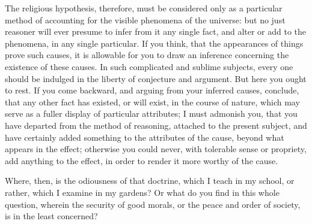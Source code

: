 \documentclass[]{article}
\begin{document}
\begin{sectionbody}
\humeparagraph  The religious hypothesis, therefore, must be considered only as a particular method of accounting for the visible phenomena of the universe: but no just reasoner will ever presume to infer from it any single fact, and alter or add to the phenomena, in any single particular. If you think, that the appearances of things prove such causes, it is allowable for you to draw an inference concerning the existence of these causes. In such complicated and sublime subjects, every one should be indulged in the liberty of conjecture and argument. But here you ought to rest. If you come backward, and arguing from your inferred causes, conclude, that any other fact has existed, or will exist, in the course of nature, which may serve as a fuller display of particular attributes; I must admonish you, that you have departed from the method of reasoning, attached to the present subject, and have certainly added something to the attributes of the cause, beyond what appears in the effect; otherwise you could never, with tolerable sense or propriety, add anything to the effect, in order to render it more worthy of the cause.

\humeparagraph  Where, then, is the odiousness of that doctrine, which I teach in my school, or rather, which I examine in my gardens? Or what do you find in this whole question, wherein the security of good morals, or the peace and order of society, is in the least concerned?


\end{sectionbody}
\end{document}
